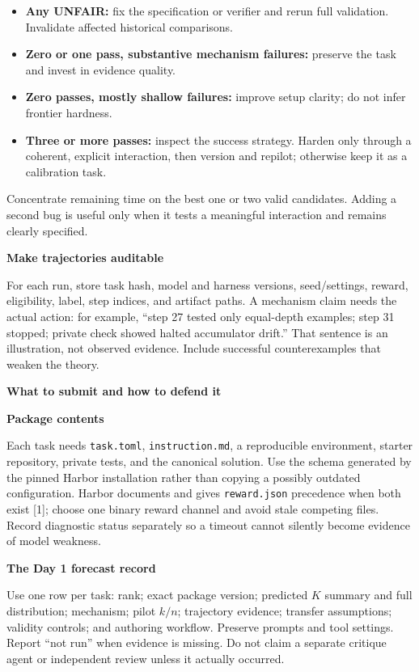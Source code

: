 \documentclass[11pt,a4paper]{article}
\newcommand{\sect}[2]{\vspace{3pt}{\small\color{accent}\textbf{#1}}\par{\LARGE\bfseries #2}\par\vspace{6pt}}
\newcommand{\sub}[1]{\vspace{4pt}\textbf{#1}\par}
\newcommand{\code}[1]{\texttt{#1}}
\begin{document}
\begin{itemize}
\item \textbf{Any UNFAIR:} fix the specification or verifier and rerun full validation. Invalidate affected historical comparisons.
\item \textbf{Zero or one pass, substantive mechanism failures:} preserve the task and invest in evidence quality.
\item \textbf{Zero passes, mostly shallow failures:} improve setup clarity; do not infer frontier hardness.
\item \textbf{Three or more passes:} inspect the success strategy. Harden only through a coherent, explicit interaction, then version and repilot; otherwise keep it as a calibration task.
\end{itemize}
Concentrate remaining time on the best one or two valid candidates. Adding a second bug is useful only when it tests a meaningful interaction and remains clearly specified.

\sub{Make trajectories auditable}
For each run, store task hash, model and harness versions, seed/settings, reward, eligibility, label, step indices, and artifact paths. A mechanism claim needs the actual action: for example, ``step 27 tested only equal-depth examples; step 31 stopped; private check showed halted accumulator drift.'' That sentence is an illustration, not observed evidence. Include successful counterexamples that weaken the theory.

\newpage
\sect{07 / SUBMISSION}{What to submit and how to defend it}
\small

\sub{Package contents}
Each task needs \code{task.toml}, \code{instruction.md}, a reproducible environment, starter repository, private tests, and the canonical solution. Use the schema generated by the pinned Harbor installation rather than copying a possibly outdated configuration. Harbor documents  and gives \code{reward.json} precedence when both exist [1]; choose one binary reward channel and avoid stale competing files. Record diagnostic status separately so a timeout cannot silently become evidence of model weakness.

\sub{The Day 1 forecast record}
Use one row per task: rank; exact package version; predicted $K$ summary and full distribution; mechanism; pilot $k/n$; trajectory evidence; transfer assumptions; validity controls; and authoring workflow. Preserve prompts and tool settings. Report ``not run'' when evidence is missing. Do not claim a separate critique agent or independent review unless it actually occurred.
\end{document}
